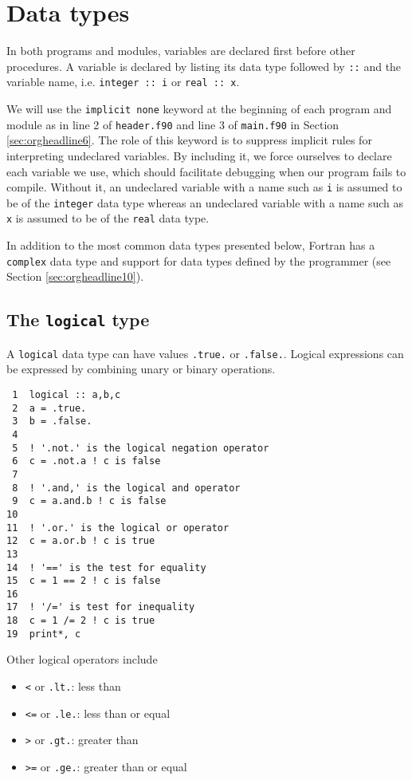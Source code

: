 \documentclass[11pt]{article}
\begin{document}
\section{Data types}
\label{sec:orgheadline23}
In both programs and modules, variables are declared first before other procedures. A variable is declared by listing its data type followed by \texttt{::} and the variable name, i.e. \texttt{integer :: i} or \texttt{real :: x}.

We will use the \texttt{implicit none} keyword at the beginning of each program and module as in line 2 of \texttt{header.f90} and line 3 of \texttt{main.f90} in Section \ref{sec:orgheadline6}. The role of this keyword is to suppress implicit rules for interpreting undeclared variables. By including it, we force ourselves to declare each variable we use, which should facilitate debugging when our program fails to compile. Without it, an undeclared variable with a name such as \texttt{i} is assumed to be of the \texttt{integer} data type whereas an undeclared variable with a name such as \texttt{x} is assumed to be of the \texttt{real} data type.

In addition to the most common data types presented below, Fortran has a \texttt{complex} data type and support for data types defined by the programmer (see Section \ref{sec:orgheadline10}).

\subsection{The \texttt{logical} type}
\label{sec:orgheadline12}
A \texttt{logical} data type can have values \texttt{.true.} or \texttt{.false.}. Logical expressions can be expressed by combining unary or binary operations.

\begin{verbatim}
 1  logical :: a,b,c
 2  a = .true.
 3  b = .false.
 4  
 5  ! '.not.' is the logical negation operator
 6  c = .not.a ! c is false
 7  
 8  ! '.and,' is the logical and operator
 9  c = a.and.b ! c is false
10  
11  ! '.or.' is the logical or operator
12  c = a.or.b ! c is true
13  
14  ! '==' is the test for equality
15  c = 1 == 2 ! c is false
16  
17  ! '/=' is test for inequality
18  c = 1 /= 2 ! c is true
19  print*, c
\end{verbatim}

Other logical operators include
\begin{itemize}
\item \texttt{<} or \texttt{.lt.}: less than
\item \texttt{<=} or \texttt{.le.}: less than or equal
\item \texttt{>} or \texttt{.gt.}: greater than
\item \texttt{>=} or \texttt{.ge.}: greater than or equal
\end{itemize}
\end{document}

